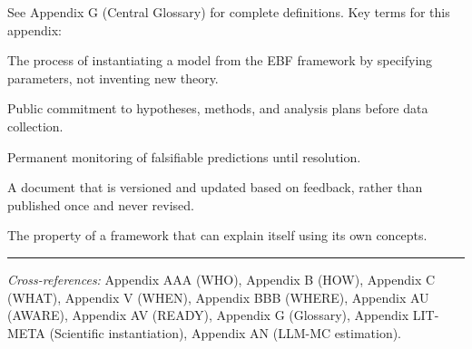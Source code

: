 See Appendix G (Central Glossary) for complete definitions. Key terms for
this appendix:

\begin{description}[nosep]
    \item[Derivation] The process of instantiating a model from the EBF framework
        by specifying parameters, not inventing new theory.
    \item[Pre-registration] Public commitment to hypotheses, methods, and analysis
        plans before data collection.
    \item[Prediction tracking] Permanent monitoring of falsifiable predictions
        until resolution.
    \item[Living document] A document that is versioned and updated based on
        feedback, rather than published once and never revised.
    \item[Reflexive validity] The property of a framework that can explain itself
        using its own concepts.
\end{description}



\vspace{1em}
\hrule
\vspace{0.5em}

\noindent\textit{Cross-references:}
Appendix AAA (WHO),
Appendix B (HOW),
Appendix C (WHAT),
Appendix V (WHEN),
Appendix BBB (WHERE),
Appendix AU (AWARE),
Appendix AV (READY),
Appendix G (Glossary),
Appendix LIT-META (Scientific instantiation),
Appendix AN (LLM-MC estimation).

